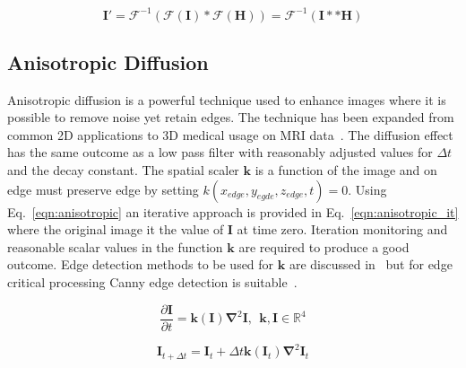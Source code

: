 \documentclass[journal]{IEEEtran}
\begin{document}

\begin{equation}
	\textbf{I}' = \mathcal{F}^{-1}(\mathcal{F}(\textbf{I})*\mathcal{F}(\textbf{H})) = \mathcal{F}^{-1}(\textbf{I}**\textbf{H})		%
	\label{eqn:same} 
\end{equation}


\subsection{Anisotropic Diffusion}
Anisotropic diffusion is a powerful technique used to enhance images where it is possible to remove noise yet retain edges.
The technique has been expanded from common 2D applications to 3D medical usage on MRI data~\cite{nakh11three}.
The diffusion effect has the same outcome as a low pass filter with reasonably adjusted values for $\Delta t$ and the decay constant.
The spatial scaler $\mathbf{k}$ is a function of the image and on edge must preserve edge by setting $k(x_{edge},y_{egde},z_{edge},t) = 0$.
Using Eq.~\eqref{eqn:anisotropic} an iterative approach is provided in Eq.~\eqref{eqn:anisotropic_it} where the original image it the value of $\mathbf{I}$ at time zero.
Iteration monitoring and reasonable scalar values in the function $\mathbf{k}$ are required to produce a good outcome.
Edge detection methods to be used for $\mathbf{k}$ are discussed in~\cite{nixon02feature} but for edge critical processing Canny edge detection is suitable~\cite{canny86edge}. 

\begin{equation}
	\frac{\partial \mathbf{I}}{\partial t} = \mathbf{k(\mathbf{I})} \mathbf{\nabla}^2 \mathbf{I},\:\:\mathbf{k},\mathbf{I} \in \mathbb{R}^4
	\label{eqn:anisotropic} 
\end{equation}

\begin{equation}
	\mathbf{I}_{t + \Delta t} = \mathbf{I}_t + \Delta t\mathbf{k}(\mathbf{I}_t)\mathbf{\nabla}^2\mathbf{I}_t
	\label{eqn:anisotropic_it} 
\end{equation}
\end{document}
